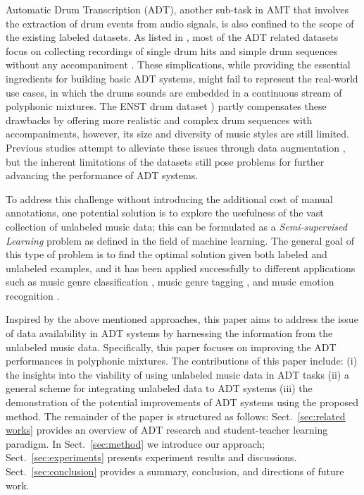 \documentclass{article}
\begin{document}
Automatic Drum Transcription (ADT), another sub-task in AMT that involves the extraction of drum events from audio signals, is also confined to the scope of the existing labeled datasets. As listed in \cite{Wu2016}, most of the ADT related datasets focus on collecting recordings of single drum hits \cite{Tindale2004, Prockup2013} and simple drum sequences without any accompaniment \cite{Dittmar2014}. These simplications, while providing the essential ingredients for building basic ADT systems, might fail to represent the real-world use cases, in which the drums sounds are embedded in a continuous stream of polyphonic mixtures. The ENST drum dataset \cite{Gillet2006}) partly compensates these drawbacks by offering more realistic and complex drum sequences with accompaniments, however, its size and diversity of music styles are still limited. Previous studies attempt to alleviate these issues through data augmentation \cite{Wu2016, Vogl2017}, but the inherent limitations of the datasets still pose problems for further advancing the performance of ADT systems. 

To address this challenge without introducing the additional cost of manual annotations, one potential solution is to explore the usefulness of the vast collection of unlabeled music data; this can be formulated as a \textit{Semi-supervised Learning} \cite{Chapelle2006} problem as defined in the field of machine learning. The general goal of this type of problem is to find the optimal solution given both labeled and unlabeled examples, and it has been applied successfully to different applications such as music genre classification \cite{Raina2007a}, music genre tagging \cite{Jao2015}, and music emotion recognition \cite{Wu2013a}.

Inspired by the above mentioned approaches, this paper aims to address the issue of data availability in ADT systems by harnessing the information from the unlabeled music data. Specifically, this paper focuses on improving the ADT performances in polyphonic mixtures. The contributions of this paper include: (i) the insights into the viability of using unlabeled music data in ADT tasks (ii) a general scheme for integrating unlabeled data to ADT systems (iii) the demonstration of the potential improvements of ADT systems using the proposed method. The remainder of the paper is structured as follows: Sect.~\ref{sec:related works} provides an overview of ADT research and student-teacher learning paradigm. In Sect.~\ref{sec:method} we introduce our approach; Sect.~\ref{sec:experiments} presents experiment results and discussions. Sect.~\ref{sec:conclusion} provides a summary, conclusion, and directions of future work.
\end{document}
